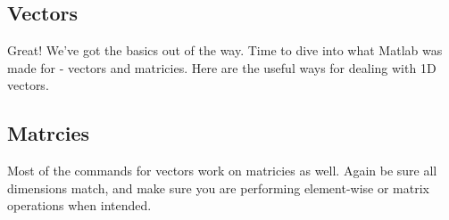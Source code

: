 \pagebreak
\subsection{Vectors}
Great! We've got the basics out of the way.
 Time to dive into what Matlab was made for - vectors and matricies.
 Here are the useful ways for dealing with 1D vectors.

\begin{quote}

\end{quote}

\pagebreak
\subsection{Matrcies}
Most of the commands for vectors work on matricies as well.
 Again be sure all dimensions match, and make sure you are performing element-wise or matrix operations when intended.

\begin{quote}

\end{quote}